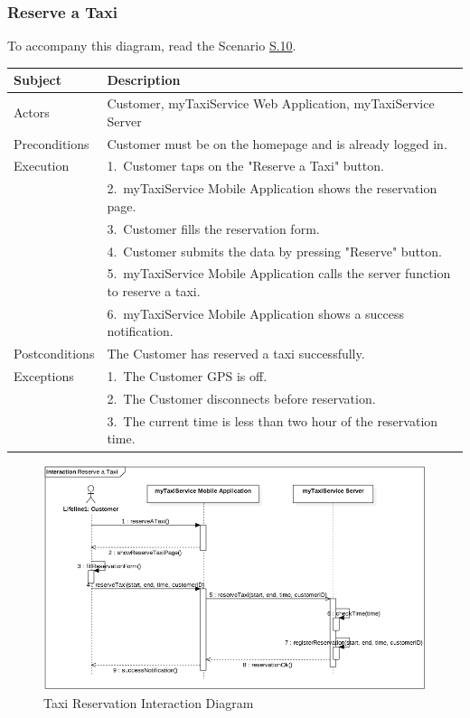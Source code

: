 \subsubsection{Reserve a Taxi}
			To accompany this diagram, read the Scenario \hyperref[sec:TaxiReservationScenario]{S.10}.

				\begin{table}[htpb]
					\centering
					\label{tab:TaxiReservationTable}
					\begin{tabularx}{\textwidth}{lp{9cm}}
						\hline
						\hline
							\textbf{Subject}
						& 
							\textbf{Description}\\
						\hline
							Actors	       &  Customer, myTaxiService Web Application, myTaxiService Server\\
						\hline
							Preconditions  &  Customer must be on the homepage and is already logged in.\\
						\hline
							Execution      &  1.~Customer taps on the "Reserve a Taxi" button.\\
										   &  2.~myTaxiService Mobile Application shows the reservation page.\\
										   &  3.~Customer fills the reservation form.\\
										   &  4.~Customer submits the data by pressing "Reserve" button.\\
										   &  5.~myTaxiService Mobile Application calls the server function to reserve a taxi.\\
										   &  6.~myTaxiService Mobile Application shows a success notification.\\
						\hline
							Postconditions &  The Customer has reserved a taxi successfully.\\
						\hline
							Exceptions     &  1.~The Customer GPS is off.\\
							               &  2.~The Customer disconnects before reservation.\\
							               &  3.~The current time is less than two hour of the reservation time.\\
									
						\hline
						\hline
					\end{tabularx}
				\end{table}
				
				\begin{figure}[H]
					\centering
					\includegraphics[width=\textwidth, scale=0.5]{IMG/InteractionDiagrams/TaxiReservation.png}
					\caption{Taxi Reservation Interaction Diagram}\label{sec:FigureTaxiReservation}
				\end{figure}